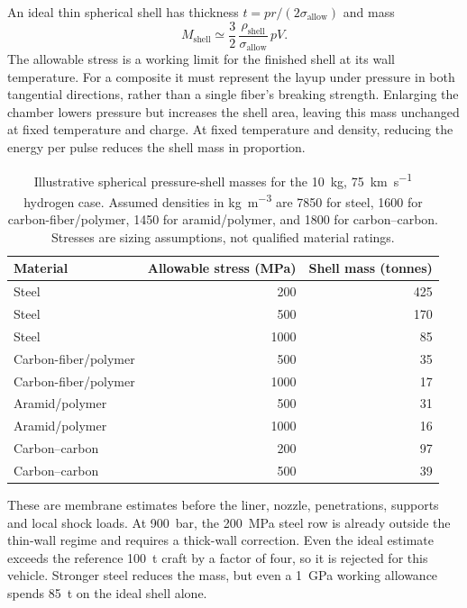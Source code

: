\documentclass{article}
\begin{document}
An ideal thin spherical shell has thickness $t=pr/(2\sigma_{\mathrm{allow}})$ and mass
\begin{equation}\label{eq:hydrogen_pressure_shell_mass}
    M_{\mathrm{shell}} \simeq \frac{3}{2}\,
       \frac{\rho_{\mathrm{shell}}}{\sigma_{\mathrm{allow}}}\,pV.
\end{equation}
The allowable stress is a working limit for the finished shell at its wall temperature. For a composite it must represent the layup under pressure in both tangential directions, rather than a single fiber's breaking strength. Enlarging the chamber lowers pressure but increases the shell area, leaving this mass unchanged at fixed temperature and charge. At fixed temperature and density, reducing the energy per pulse reduces the shell mass in proportion.

\begin{table}[!htpb]
    \centering
    \caption{Illustrative spherical pressure-shell masses for the \SI{10}{\kilogram}, \SI{75}{\kilo\meter\per\second} hydrogen case. Assumed densities in \si{\kilogram\per\cubic\meter} are 7850 for steel, 1600 for carbon-fiber/polymer, 1450 for aramid/polymer, and 1800 for carbon--carbon. Stresses are sizing assumptions, not qualified material ratings.}
    \label{tab:hydrogen_pressure_shell}
    \begin{tabular}{lrr}
        \hline
        Material & Allowable stress (MPa) & Shell mass (tonnes) \\
        \hline
        Steel & 200 & 425 \\
        Steel & 500 & 170 \\
        Steel & 1000 & 85 \\
        Carbon-fiber/polymer & 500 & 35 \\
        Carbon-fiber/polymer & 1000 & 17 \\
        Aramid/polymer & 500 & 31 \\
        Aramid/polymer & 1000 & 16 \\
        Carbon--carbon & 200 & 97 \\
        Carbon--carbon & 500 & 39 \\
        \hline
    \end{tabular}
\end{table}

These are membrane estimates before the liner, nozzle, penetrations, supports and local shock loads. At \SI{900}{\bar}, the \SI{200}{\mega\pascal} steel row is already outside the thin-wall regime and requires a thick-wall correction. Even the ideal estimate exceeds the reference \SI{100}{\tonne} craft by a factor of four, so it is rejected for this vehicle. Stronger steel reduces the mass, but even a \SI{1}{\giga\pascal} working allowance spends \SI{85}{\tonne} on the ideal shell alone.
\end{document}
